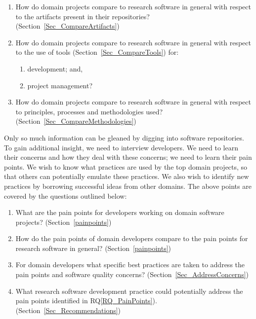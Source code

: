 \documentclass[runningheads]{llncs}
\newcounter{rqnum} %
\newcommand{\rqref}[1]{RQ\ref{#1}}
\begin{document}
\begin{enumerate}
  \item [RQ\refstepcounter{rqnum}\therqnum \label{RQ_CompareArtifacts}:] How
	do domain projects compare to research software in general with respect to the
	artifacts present in their repositories? (Section~\ref{Sec_CompareArtifacts})
	\item [RQ\refstepcounter{rqnum}\therqnum \label{RQ_CompareToolsProjMngmnt}:]
	How do domain projects compare to research software in general with respect to
	the use of tools (Section~\ref{Sec_CompareTools}) for:
	\begin{enumerate} 
		\item [\rqref{RQ_CompareToolsProjMngmnt}.a] development; and,
		\item [\rqref{RQ_CompareToolsProjMngmnt}.b] project management?
	\end{enumerate}
	\item [RQ\refstepcounter{rqnum}\therqnum \label{RQ_CompareMethodologies}:]
	How do domain projects compare to research software in general with respect to
	principles, processes and methodologies used? (Section~\ref{Sec_CompareMethodologies})
\end{enumerate}	

Only so much information can be gleaned by digging into software repositories.
To gain additional insight, we need to interview developers.  We need to learn
their concerns and how they deal with these concerns; we need to learn their
pain points.  We wish to know what practices are used by the top domain
projects, so that others can potentially emulate these practices. We also wish
to identify new practices by borrowing successful ideas from other domains. The
above points are covered by the questions outlined below:

\begin{enumerate}
	\item [RQ\refstepcounter{rqnum}\therqnum \label{RQ_PainPoints}:] What are
	the pain points for developers working on domain software projects?
	(Section~\ref{painpoints})
	\item [RQ\refstepcounter{rqnum}\therqnum \label{RQ_ComparePainPoints}:] How
	do the pain points of domain developers compare to the pain points
	for research software in general? (Section~\ref{painpoints})
	\item [RQ\refstepcounter{rqnum}\therqnum \label{RQ_Concerns}:] For domain
	developers what specific best practices are taken to address the pain points
	and software quality concerns? (Section~\ref{Sec_AddressConcerns})
	\item [RQ\refstepcounter{rqnum}\therqnum \label{RQ_Recommend}:]
	What research software development practice could potentially address the
	pain points identified in \rqref{RQ_PainPoints}).
	(Section~\ref{Sec_Recommendations})
\end{enumerate}
\end{document}
